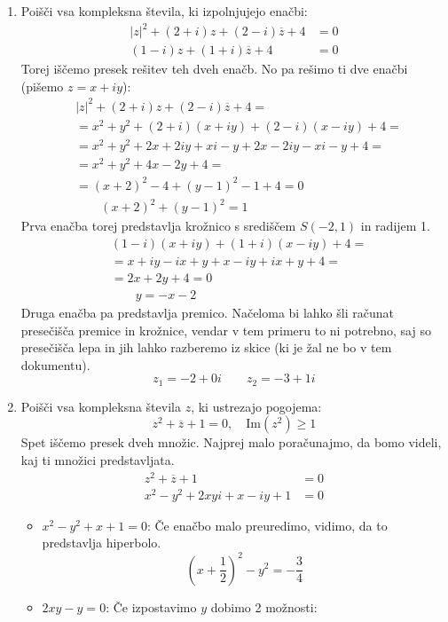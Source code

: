 \documentclass[12pt,a4paper,slovene]{article}
\begin{document}
\begin{enumerate}[(1)]
     
    \item Poišči vsa kompleksna števila, ki izpolnjujejo enačbi:
    \begin{align*}
    |z|^2 + (2 + i)z  + (2 - i)\overline{z} + 4 &= 0 \\
    (1-  i)z + (1 + i)\overline{z} + 4 &= 0    
    \end{align*} 
    Torej iščemo presek rešitev teh dveh enačb. No pa rešimo ti dve enačbi (pišemo $z = x + iy$):
    \begin{align*}
    &|z|^2 + (2 + i)z  + (2 - i)\overline{z} + 4 = \\
    &= x^2 + y^2 + (2 + i)(x + iy) + (2 - i)(x - iy) + 4 =\\
    &= x^2 + y^2 + 2x + 2iy + xi - y + 2x - 2iy - xi - y + 4 =\\
    &= x^2 + y^2 + 4x - 2y + 4 = \\
    &= (x + 2)^2 - 4 + (y - 1)^2 - 1 + 4 = 0\\
    &\qquad (x + 2)^2 + (y - 1)^2 = 1
    \end{align*} 
    Prva enačba torej predstavlja krožnico s središčem $S(-2, 1)$ in radijem 1.
    \begin{align*}
    &(1-  i)(x + iy) + (1 + i)(x - iy) + 4 =\\
    &= x + iy - ix  + y + x -iy + ix + y + 4 =\\
    &= 2x + 2y + 4 = 0\\
    &\qquad y = -x -2
    \end{align*} 
    Druga enačba pa predstavlja premico. Načeloma bi lahko šli računat presečišča premice in krožnice, vendar v tem primeru to ni potrebno, saj so presečišča lepa in jih lahko razberemo iz skice (ki je žal ne bo v tem dokumentu).
    \[
    z_1 = -2 + 0i\qquad z_2 = -3 + 1i
    \]

    \item Poišči vsa kompleksna števila $z$, ki ustrezajo pogojema:
    \[
    z^2 + \overline{z} + 1 = 0, \quad \text{Im}(z^2) \geq 1
    \]
    Spet iščemo presek dveh množic. Najprej malo poračunajmo, da bomo videli, kaj ti množici predstavljata.
    \begin{align*}
    z^2 + \overline{z} + 1 &= 0\\
    x^2 - y^2 + 2xyi + x - iy + 1 &= 0
    \end{align*} 
    \begin{itemize}
        \item $x^2 - y^2 + x + 1 = 0$: Če enačbo malo preuredimo, vidimo, da to predstavlja hiperbolo.
        \[
        (x + \frac{1}{2})^2 - y^2 = -\frac{3}{4} 
        \]
        \item $2xy - y = 0$: Če izpostavimo $y$ dobimo 2 možnosti:
        

\end{itemize}
\end{enumerate}
\end{document}
